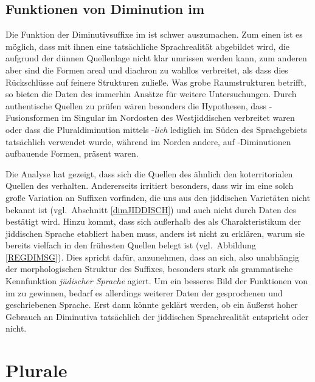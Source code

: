  \subsection{Funktionen von Diminution im \hai{{\LiJi}} }\label{DIMFunktionen}
   Die Funktion der Diminutivsuffixe im  ist schwer auszumachen. Zum einen ist es möglich, dass mit ihnen  eine tatsächliche Sprachrealität abgebildet wird, die aufgrund der dünnen Quellenlage nicht klar umrissen werden kann, zum anderen aber sind die Formen areal und diachron zu wahllos verbreitet, als dass dies Rückschlüsse auf feinere Strukturen zuließe. Was grobe Raumstrukturen betrifft, so bieten die Daten des  immerhin Ansätze für weitere Untersuchungen. Durch authentische Quellen zu prüfen wären besonders die Hypothesen, dass -Fusionsformen im Singular im Nordosten des Westjiddischen verbreitet waren oder dass die Pluraldiminution mittels -\textit{lich} lediglich im Süden des Sprachgebiets tatsächlich verwendet wurde, während im Norden andere, auf -Diminutionen aufbauende Formen, präsent waren.


Die Analyse hat gezeigt, dass sich die Quellen des   ähnlich den koterritorialen Quellen des  verhalten. Andererseits irritiert besonders, dass wir im  eine solch große Variation an Suffixen vorfinden, die uns aus den jiddischen Varietäten nicht bekannt ist (vgl.\, Abschnitt \ref{dimJIDDISCH}) und auch nicht durch Daten des  bestätigt wird. Hinzu kommt, dass sich  außerhalb des \hai{{\LiJi}} als Charakteristikum der jiddischen Sprache etabliert haben muss, anders ist nicht zu erklären, warum sie bereits vielfach in den frühesten Quellen belegt ist (vgl.\, Abbildung \ref{REGDIMSG}). Dies spricht dafür, anzunehmen, dass  an sich, also unabhängig der morphologischen Struktur des Suffixes, besonders stark als grammatische Kennfunktion \textit{jüdischer Sprache} agiert. Um ein besseres Bild der Funktionen von  im \hai{{\LiJi}} zu gewinnen, bedarf es allerdings weiterer Daten der gesprochenen und geschriebenen Sprache. Erst dann könnte geklärt werden, ob ein äußerst hoher Gebrauch an Diminutiva tatsächlich der jiddischen Sprachrealität entspricht oder nicht. 

 \section{Plurale}\label{pl}


